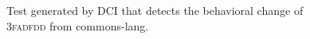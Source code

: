 \begin{figure}[h]
\centering
{}
\caption{Test generated by DCI that detects the behavioral change of \textsc{3fadfdd} from commons-lang.}
\label{fig:amplified_commons_lang_success}
\end{figure}


